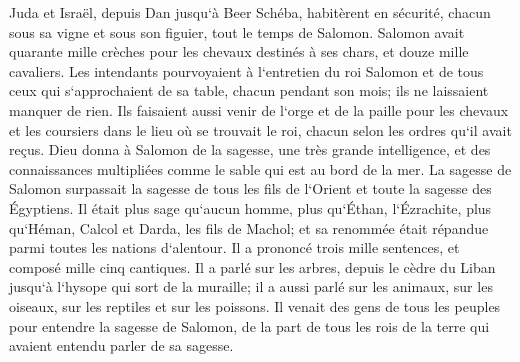\verse Juda et Israël, depuis Dan jusqu`à Beer Schéba, habitèrent en sécurité, chacun sous sa vigne et sous son figuier, tout le temps de Salomon. 
\verse Salomon avait quarante mille crèches pour les chevaux destinés à ses chars, et douze mille cavaliers. 
\verse Les intendants pourvoyaient à l`entretien du roi Salomon et de tous ceux qui s`approchaient de sa table, chacun pendant son mois; ils ne laissaient manquer de rien. 
\verse Ils faisaient aussi venir de l`orge et de la paille pour les chevaux et les coursiers dans le lieu où se trouvait le roi, chacun selon les ordres qu`il avait reçus. 
\verse Dieu donna à Salomon de la sagesse, une très grande intelligence, et des connaissances multipliées comme le sable qui est au bord de la mer. 
\verse La sagesse de Salomon surpassait la sagesse de tous les fils de l`Orient et toute la sagesse des Égyptiens. 
\verse Il était plus sage qu`aucun homme, plus qu`Éthan, l`Ézrachite, plus qu`Héman, Calcol et Darda, les fils de Machol; et sa renommée était répandue parmi toutes les nations d`alentour. 
\verse Il a prononcé trois mille sentences, et composé mille cinq cantiques. 
\verse Il a parlé sur les arbres, depuis le cèdre du Liban jusqu`à l`hysope qui sort de la muraille; il a aussi parlé sur les animaux, sur les oiseaux, sur les reptiles et sur les poissons. 
\verse Il venait des gens de tous les peuples pour entendre la sagesse de Salomon, de la part de tous les rois de la terre qui avaient entendu parler de sa sagesse. 

\chapter{}

